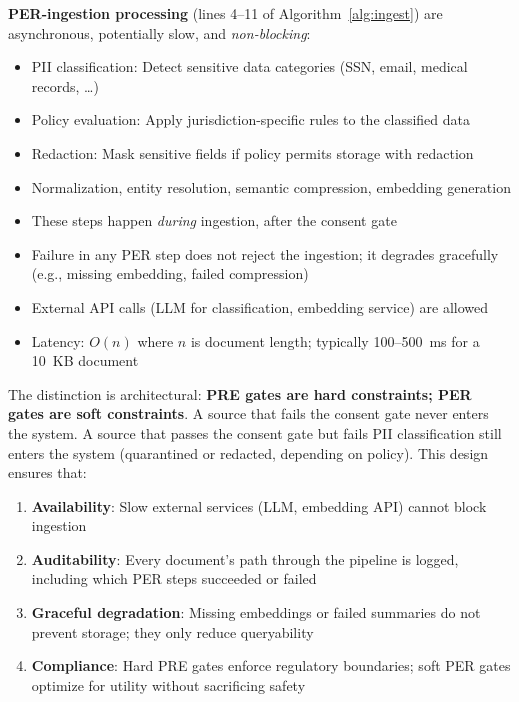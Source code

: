 \documentclass[11pt,twocolumn]{article}
\begin{document}
\textbf{PER-ingestion processing} (lines 4--11 of Algorithm~\ref{alg:ingest}) are asynchronous, potentially slow, and \emph{non-blocking}:

\begin{itemize}[nosep,leftmargin=1.2em]
  \item PII classification: Detect sensitive data categories (SSN, email, medical records, \ldots)
  \item Policy evaluation: Apply jurisdiction-specific rules to the classified data
  \item Redaction: Mask sensitive fields if policy permits storage with redaction
  \item Normalization, entity resolution, semantic compression, embedding generation
  \item These steps happen \emph{during} ingestion, after the consent gate
  \item Failure in any PER step does not reject the ingestion; it degrades gracefully (e.g., missing embedding, failed compression)
  \item External API calls (LLM for classification, embedding service) are allowed
  \item Latency: $O(n)$ where $n$ is document length; typically 100--500~ms for a 10~KB document
\end{itemize}

The distinction is architectural: \textbf{PRE gates are hard constraints; PER gates are soft constraints}. A source that fails the consent gate never enters the system. A source that passes the consent gate but fails PII classification still enters the system (quarantined or redacted, depending on policy). This design ensures that:

\begin{enumerate}[nosep,leftmargin=1.2em]
  \item \textbf{Availability}: Slow external services (LLM, embedding API) cannot block ingestion
  \item \textbf{Auditability}: Every document's path through the pipeline is logged, including which PER steps succeeded or failed
  \item \textbf{Graceful degradation}: Missing embeddings or failed summaries do not prevent storage; they only reduce queryability
  \item \textbf{Compliance}: Hard PRE gates enforce regulatory boundaries; soft PER gates optimize for utility without sacrificing safety
\end{enumerate}
\end{document}
